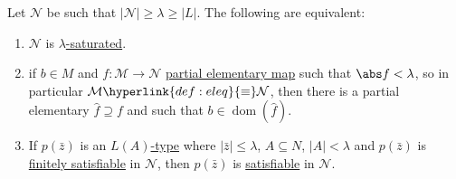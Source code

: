 \documentclass{article}
\DeclareMathOperator{\dom}{dom}
\begin{document}
\begin{nthm}\label{thm:6.5}
  Let $\mathcal{N}$ be such that $|\mathcal{N}| \geq \lambda \geq |L|$. The following are equivalent:
  \begin{enumerate}[label=(\roman*)]
    \item $\mathcal{N}$ is \hyperlink{def:sat}{$\lambda$-saturated}.
    \item if $b \in M$ and $f: \mathcal{M} \to \mathcal{N}$ \hyperlink{def:elmap}{partial elementary map} such that $\abs f < \lambda$, so in particular $\mathcal{M} \hyperlink{def:eleq}{\equiv} \mathcal{N}$, then there is a partial elementary $\hat{f} \supseteq f$ and such that $b \in \dom(\hat{f})$.
    \item If $p(\bar{z})$ is an \hyperlink{def:typeparam}{$L(A)$-type} where $|\bar{z}| \leq \lambda$, $A \subseteq N$, $|A| < \lambda$ and $p(\bar{z})$ is \hyperlink{def:type}{finitely satisfiable} in $\mathcal{N}$, then $p(\bar{z})$ is \hyperlink{def:type}{satisfiable} in $\mathcal{N}$.
  \end{enumerate}
\end{nthm}
\end{document}
